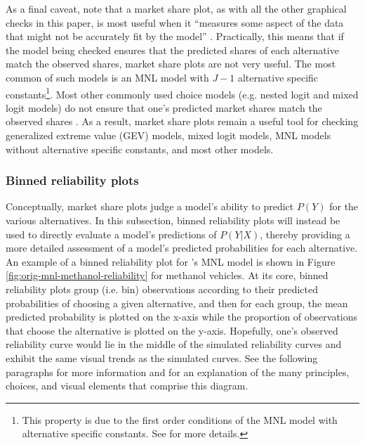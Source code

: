 \documentclass[preprint]{elsarticle}
\begin{document}
As a final caveat, note that a market share plot, as with all the other graphical checks in this paper, is most useful when it ``measures some aspect of the data that might not be accurately fit by the model'' \citep[p.191]{gelman_1996_model}. Practically, this means that if the model being checked ensures that the predicted shares of each alternative match the observed shares, market share plots are not very useful. The most common of such models is an MNL model with $J - 1$ alternative specific constants\footnote{This property is due to the first order conditions of the MNL model with alternative specific constants. See \citet[p.62]{train_discrete_2009} for more details.}. Most other commonly used choice models (e.g. nested logit and mixed logit models) do not ensure that one's predicted market shares match the observed shares \citep{donoso_maximum_2011, klaiber_random_2018}. As a result, market share plots remain a useful tool for checking generalized extreme value (GEV) models, mixed logit models, MNL models without alternative specific constants, and most other models.

\subsubsection{Binned reliability plots}
\label{sec:case1-part1-reliability-plots}
Conceptually, market share plots judge a model's ability to predict $P \left( Y \right)$ for the various alternatives. In this subsection, binned reliability plots will instead be used to directly evaluate a model's predictions of $P \left( Y | X \right)$, thereby providing a more detailed assessment of a model's predicted probabilities for each alternative. An example of a binned reliability plot for \citeauthor{brownstone_forecasting_1998}'s MNL model is shown in Figure \ref{fig:orig-mnl-methanol-reliability} for methanol vehicles. At its core, binned reliability plots group (i.e. bin) observations according to their predicted probabilities of choosing a given alternative, and then for each group, the mean predicted probability is plotted on the x-axis while the proportion of observations that choose the alternative is plotted on the y-axis. Hopefully, one's observed reliability curve would lie in the middle of the simulated reliability curves and exhibit the same visual trends as the simulated curves. See the following paragraphs for more information and for an explanation of the many principles, choices, and visual elements that comprise this diagram. 
\end{document}
